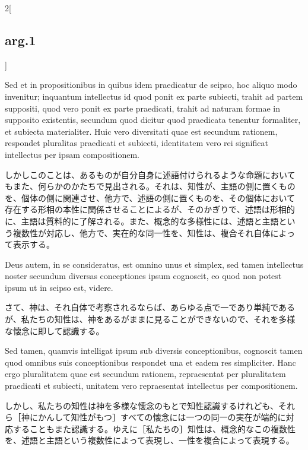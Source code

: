 \documentclass[paper=a4paper,fontsize=10pt,jafontsize=9pt,titlepage]{jlreq}
\begin{document}
\begin{paracol}{2}[\subsection{arg.1}]
\switchcolumn*

Sed et in propositionibus in quibus idem praedicatur de seipso, hoc
aliquo modo invenitur; inquantum intellectus id quod ponit ex parte
subiecti, trahit ad partem suppositi, quod vero ponit ex parte
praedicati, trahit ad naturam formae in supposito existentis, secundum
quod dicitur quod praedicata tenentur formaliter, et subiecta
materialiter. Huic vero diversitati quae est secundum rationem,
respondet pluralitas praedicati et subiecti, identitatem vero rei
significat intellectus per ipsam compositionem.

\switchcolumn

しかしこのことは、あるものが自分自身に述語付けられるような命題において
もまた、何らかのかたちで見出される。それは、知性が、主語の側に置くもの
を、個体の側に関連させ、他方で、述語の側に置くものを、その個体において
存在する形相の本性に関係させることによるが、そのかぎりで、述語は形相的
に、主語は質料的に了解される。また、概念的な多様性には、述語と主語とい
う複数性が対応し、他方で、実在的な同一性を、知性は、複合それ自体によっ
て表示する。

\switchcolumn*

Deus autem, in se consideratus, est omnino unus et simplex, sed tamen
intellectus noster secundum diversas conceptiones ipsum cognoscit, eo
quod non potest ipsum ut in seipso est, videre.

\switchcolumn

さて、神は、それ自体で考察されるならば、あらゆる点で一であり単純である
が、私たちの知性は、神をあるがままに見ることができないので、それを多様
な懐念に即して認識する。

\switchcolumn*

Sed tamen, quamvis intelligat ipsum sub diversis conceptionibus,
cognoscit tamen quod omnibus suis conceptionibus respondet una et
eadem res simpliciter. Hanc ergo pluralitatem quae est secundum
rationem, repraesentat per pluralitatem praedicati et subiecti,
unitatem vero repraesentat intellectus per compositionem.

\switchcolumn

しかし、私たちの知性は神を多様な懐念のもとで知性認識するけれども、それ
ら［神にかんして知性がもつ］すべての懐念には一つの同一の実在が端的に対
応することもまた認識する。ゆえに［私たちの］知性は、概念的なこの複数性
を、述語と主語という複数性によって表現し、一性を複合によって表現する。

\switchcolumn*[\subsection{ad.1}]


\end{paracol}
\end{document}
